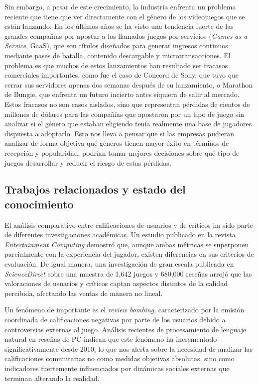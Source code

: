\documentclass[letterpaper,11pt]{article}
\begin{document}
Sin embargo, a pesar de este crecimiento, la industria enfrenta un problema reciente que tiene que ver directamente con el género de los videojuegos que se están lanzando. En los últimos años se ha visto una tendencia fuerte de las grandes compañías por apostar a los llamados juegos por servicios (\textit{Games as a Service}, GaaS), que son títulos diseñados para generar ingresos continuos mediante pases de batalla, contenido descargable y microtransacciones. El problema es que muchos de estos lanzamientos han resultado ser fracasos comerciales importantes, como fue el caso de Concord de Sony, que tuvo que cerrar sus servidores apenas dos semanas después de su lanzamiento, o Marathon de Bungie, que enfrenta un futuro incierto antes siquiera de salir al mercado. Estos fracasos no son casos aislados, sino que representan pérdidas de cientos de millones de dólares para las compañías que apostaron por un tipo de juego sin analizar si el género que estaban eligiendo tenía realmente una base de jugadores dispuesta a adoptarlo. Esto nos lleva a pensar que si las empresas pudieran analizar de forma objetiva qué géneros tienen mayor éxito en términos de recepción y popularidad, podrían tomar mejores decisiones sobre qué tipo de juegos desarrollar y reducir el riesgo de estas pérdidas.
\newpage
\subsection{Trabajos relacionados y estado del conocimiento}

El análisis comparativo entre calificaciones de usuarios y de críticos ha sido parte de diferentes investigaciones académicas. Un estudio publicado en la revista \textit{Entertainment Computing} demostró que, aunque ambas métricas se superponen parcialmente con la experiencia del jugador, existen diferencias en sus criterios de evaluación. De igual manera, una investigación de gran escala publicada en \textit{ScienceDirect} sobre una muestra de 1,642 juegos y 680,000 reseñas arrojó que las valoraciones de usuarios y críticos captan aspectos distintos de la calidad percibida, afectando las ventas de manera no lineal. 

Un fenómeno de importante es el \textit{review bombing}, caracterizado por la emisión coordinada de calificaciones negativas por parte de los usuarios debido a controversias externas al juego. Análisis recientes de procesamiento de lenguaje natural en reseñas de PC indican que este fenómeno ha incrementado significativamente desde 2010, lo que nos alerta sobre la necesidad de analizar las calificaciones comunitarias no como medidas objetivas absolutas, sino como indicadores fuertemente influenciados por dinámicas sociales externas que terminan alterando la realidad.
\end{document}
